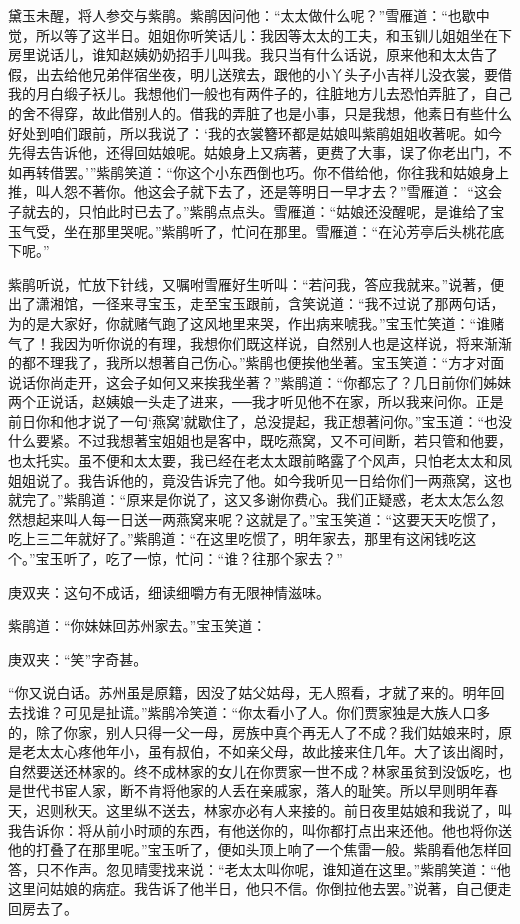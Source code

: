 \begin{parag}
    黛玉未醒，将人参交与紫鹃。紫鹃因问他：“太太做什么呢？”雪雁道：“也歇中觉，所以等了这半日。姐姐你听笑话儿：我因等太太的工夫，和玉钏儿姐姐坐在下房里说话儿，谁知赵姨奶奶招手儿叫我。我只当有什么话说，原来他和太太告了假，出去给他兄弟伴宿坐夜，明儿送殡去，跟他的小丫头子小吉祥儿没衣裳，要借我的月白缎子袄儿。我想他们一般也有两件子的，往脏地方儿去恐怕弄脏了，自己的舍不得穿，故此借别人的。借我的弄脏了也是小事，只是我想，他素日有些什么好处到咱们跟前，所以我说了：‘我的衣裳簪环都是姑娘叫紫鹃姐姐收著呢。如今先得去告诉他，还得回姑娘呢。姑娘身上又病著，更费了大事，误了你老出门，不如再转借罢。’”紫鹃笑道：“你这个小东西倒也巧。你不借给他，你往我和姑娘身上推，叫人怨不著你。他这会子就下去了，还是等明日一早才去？”雪雁道： “这会子就去的，只怕此时已去了。”紫鹃点点头。雪雁道：“姑娘还没醒呢，是谁给了宝玉气受，坐在那里哭呢。”紫鹃听了，忙问在那里。雪雁道：“在沁芳亭后头桃花底下呢。”
\end{parag}


\begin{parag}
    紫鹃听说，忙放下针线，又嘱咐雪雁好生听叫：“若问我，答应我就来。”说著，便出了潇湘馆，一径来寻宝玉，走至宝玉跟前，含笑说道：“我不过说了那两句话，为的是大家好，你就赌气跑了这风地里来哭，作出病来唬我。”宝玉忙笑道：“谁赌气了！我因为听你说的有理，我想你们既这样说，自然别人也是这样说，将来渐渐的都不理我了，我所以想著自己伤心。”紫鹃也便挨他坐著。宝玉笑道：“方才对面说话你尚走开，这会子如何又来挨我坐著？”紫鹃道：“你都忘了？几日前你们姊妹两个正说话，赵姨娘一头走了进来，──我才听见他不在家，所以我来问你。正是前日你和他才说了一句‘燕窝’就歇住了，总没提起，我正想著问你。”宝玉道：“也没什么要紧。不过我想著宝姐姐也是客中，既吃燕窝，又不可间断，若只管和他要，也太托实。虽不便和太太要，我已经在老太太跟前略露了个风声，只怕老太太和凤姐姐说了。我告诉他的，竟没告诉完了他。如今我听见一日给你们一两燕窝，这也就完了。”紫鹃道：“原来是你说了，这又多谢你费心。我们正疑惑，老太太怎么忽然想起来叫人每一日送一两燕窝来呢？这就是了。”宝玉笑道：“这要天天吃惯了，吃上三二年就好了。”紫鹃道：“在这里吃惯了，明年家去，那里有这闲钱吃这个。”宝玉听了，吃了一惊，忙问：“谁？往那个家去？”\begin{note}庚双夹：这句不成话，细读细嚼方有无限神情滋味。\end{note}紫鹃道：“你妹妹回苏州家去。”宝玉笑道：\begin{note}庚双夹：“笑”字奇甚。\end{note}“你又说白话。苏州虽是原籍，因没了姑父姑母，无人照看，才就了来的。明年回去找谁？可见是扯谎。”紫鹃冷笑道：“你太看小了人。你们贾家独是大族人口多的，除了你家，别人只得一父一母，房族中真个再无人了不成？我们姑娘来时，原是老太太心疼他年小，虽有叔伯，不如亲父母，故此接来住几年。大了该出阁时，自然要送还林家的。终不成林家的女儿在你贾家一世不成？林家虽贫到没饭吃，也是世代书宦人家，断不肯将他家的人丢在亲戚家，落人的耻笑。所以早则明年春天，迟则秋天。这里纵不送去，林家亦必有人来接的。前日夜里姑娘和我说了，叫我告诉你：将从前小时顽的东西，有他送你的，叫你都打点出来还他。他也将你送他的打叠了在那里呢。”宝玉听了，便如头顶上响了一个焦雷一般。紫鹃看他怎样回答，只不作声。忽见晴雯找来说：“老太太叫你呢，谁知道在这里。”紫鹃笑道：“他这里问姑娘的病症。我告诉了他半日，他只不信。你倒拉他去罢。”说著，自己便走回房去了。
\end{parag}


